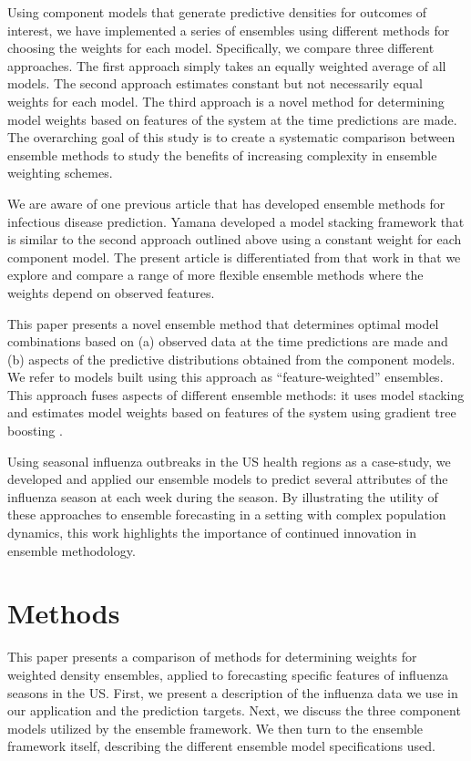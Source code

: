 \documentclass[10pt,letterpaper]{article}
\begin{document}
Using component models that generate predictive densities for outcomes
of interest, we have implemented a series of ensembles using different
methods for choosing the weights for each model. Specifically, we
compare three different approaches. The first approach simply takes an
equally weighted average of all models. The second approach estimates
constant but not necessarily equal weights for each model. The third
approach is a novel method for determining model weights based on
features of the system at the time predictions are made. The overarching
goal of this study is to create a systematic comparison between ensemble
methods to study the benefits of increasing complexity in ensemble
weighting schemes.

We are aware of one previous article that has developed ensemble methods
for infectious disease prediction. Yamana \etal \cite{Yamana2016}
developed a model stacking framework that is similar to the second
approach outlined above using a constant weight for each component
model. The present article is differentiated from that work in that we
explore and compare a range of more flexible ensemble methods where the
weights depend on observed features.

This paper presents a novel ensemble method that determines optimal
model combinations based on (a) observed data at the time predictions
are made and (b) aspects of the predictive distributions obtained from
the component models. We refer to models built using this approach as
``feature-weighted'' ensembles. This approach fuses aspects of different
ensemble methods: it uses model stacking \cite{Wolpert1992} and
estimates model weights based on features of the system \cite{Sill2009}
using gradient tree boosting \cite{friedman2001greedy}.

Using seasonal influenza outbreaks in the US health regions as a
case-study, we developed and applied our ensemble models to predict
several attributes of the influenza season at each week during the
season. By illustrating the utility of these approaches to ensemble
forecasting in a setting with complex population dynamics, this work
highlights the importance of continued innovation in ensemble
methodology.

\section{Methods}\label{methods}

This paper presents a comparison of methods for determining weights for
weighted density ensembles, applied to forecasting specific features of
influenza seasons in the US. First, we present a description of the
influenza data we use in our application and the prediction targets.
Next, we discuss the three component models utilized by the ensemble
framework. We then turn to the ensemble framework itself, describing the
different ensemble model specifications used.
\end{document}
